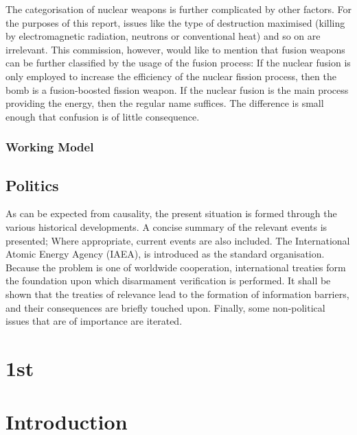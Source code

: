 \documentclass[twoside,titlepage,11pt,twocolumn,a4paper]{article}
\begin{document}
The categorisation of nuclear weapons is further complicated by other
factors. For the purposes of this report, issues like the type of
destruction maximised (killing by electromagnetic radiation, neutrons
or conventional heat) and so on are irrelevant. This commission,
however, would like to mention that fusion weapons can be further
classified by the usage of the fusion process: If the nuclear fusion
is only employed to increase the efficiency of the nuclear fission
process, then the bomb is a fusion-boosted fission weapon. If the
nuclear fusion is the main process providing the energy, then the
regular name suffices. The difference is small enough that confusion
is of little consequence.

\subsubsection{Working Model}

\subsection{Politics}
As can be expected from causality, the present situation is formed
through the various historical developments. A concise summary of the
relevant events is presented; Where appropriate, current events are
also included. The International Atomic Energy Agency (IAEA), is
introduced as the standard organisation. Because the problem is one of
worldwide cooperation, international treaties form the foundation upon
which disarmament verification is performed. It shall be shown that
the treaties of relevance lead to the formation of information
barriers, and their consequences are briefly touched upon. Finally,
some non-political issues that are of importance are iterated. 



\section{1st}
\section{Introduction}
\end{document}

